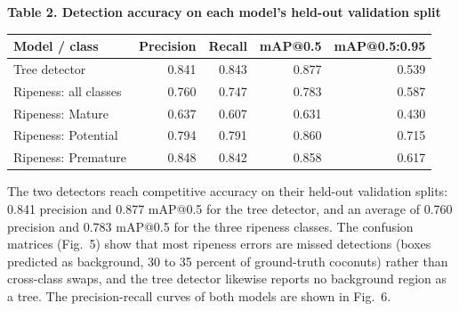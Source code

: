 \documentclass[10pt,a4paper]{article}
\newcommand{\tablecap}[1]{\par\vspace{6pt}\begin{center}{\cambria\bfseries\fontsize{10}{12}\selectfont #1}\end{center}\vspace{-2pt}}
\begin{document}
\begin{table}[!ht]
\vspace{-2pt}
\tablecap{Table 2. Detection accuracy on each model's held-out validation split}

\centering
\small
\begin{tabular}{|l|r|r|r|r|}
\hline
\textbf{Model / class} & \textbf{Precision} & \textbf{Recall} & \textbf{mAP@0.5} & \textbf{mAP@0.5:0.95} \\
\hline
Tree detector & 0.841 & 0.843 & 0.877 & 0.539 \\
\hline
Ripeness: all classes & 0.760 & 0.747 & 0.783 & 0.587 \\
\hline
Ripeness: Mature & 0.637 & 0.607 & 0.631 & 0.430 \\
\hline
Ripeness: Potential & 0.794 & 0.791 & 0.860 & 0.715 \\
\hline
Ripeness: Premature & 0.848 & 0.842 & 0.858 & 0.617 \\
\hline
\end{tabular}
\end{table}

The two detectors reach competitive accuracy on their held-out validation splits: 0.841 precision and 0.877 mAP@0.5 for the tree detector, and an average of 0.760 precision and 0.783 mAP@0.5 for the three ripeness classes. The confusion matrices (Fig.~5) show that most ripeness errors are missed detections (boxes predicted as background, 30 to 35 percent of ground-truth coconuts) rather than cross-class swaps, and the tree detector likewise reports no background region as a tree. The precision-recall curves of both models are shown in Fig.~6.
\end{document}
